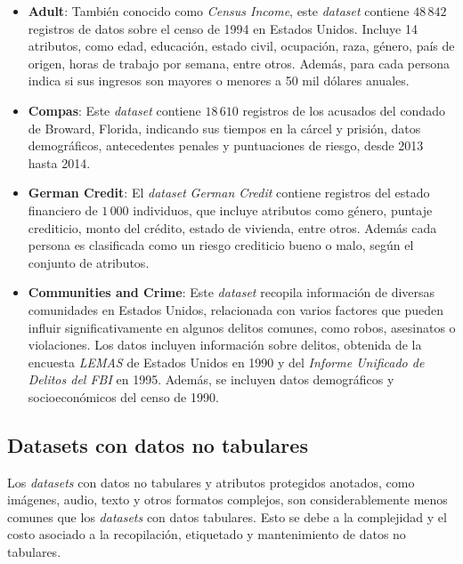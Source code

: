     \begin{itemize}
        \item \textbf{Adult}: Tambi\'en conocido como \emph{Census Income}, este \emph{dataset} contiene $48\,842$ registros de 
        datos sobre el censo de 1994 en Estados Unidos. Incluye 14 atributos, como edad, educaci\'on, estado civil,
        ocupaci\'on, raza, g\'enero, pa\'is de origen, horas de trabajo por semana, entre otros. Adem\'as, para cada 
        persona indica si sus ingresos son mayores o menores a 50 mil d\'olares anuales.
        \item \textbf{Compas}: Este \emph{dataset} contiene $18\,610$ registros de los acusados del condado de Broward, Florida,
        indicando sus tiempos en la c\'arcel y prisi\'on, datos demogr\'aficos, antecedentes penales y puntuaciones 
        de riesgo, desde 2013 hasta 2014.
        \item \textbf{German Credit}: El \emph{dataset} \emph{German Credit} contiene registros del estado financiero de $1\,000$ individuos,
        que incluye atributos como g\'enero, puntaje crediticio, monto del cr\'edito, estado de vivienda, entre otros. Adem\'as cada 
        persona es clasificada como un riesgo crediticio bueno o malo, seg\'un el conjunto de atributos.
        \item \textbf{Communities and Crime}: Este \emph{dataset} recopila informaci\'on de diversas comunidades en Estados Unidos, 
        relacionada con varios factores que pueden influir significativamente en algunos delitos comunes, como robos, asesinatos o 
        violaciones. Los datos incluyen informaci\'on sobre delitos, obtenida de la encuesta \emph{LEMAS} de Estados Unidos en 1990 y 
        del \emph{Informe Unificado de Delitos del FBI} en 1995. Adem\'as, se incluyen datos demogr\'aficos y socioecon\'omicos del 
        censo de 1990.

    \end{itemize}

    \subsection{Datasets con datos no tabulares}
    Los \emph{datasets} con datos no tabulares y atributos protegidos anotados, como im\'agenes, audio, texto y otros formatos complejos, 
    son considerablemente menos comunes que los \emph{datasets} con datos tabulares. Esto se debe a la complejidad y el costo asociado a la 
    recopilaci\'on, etiquetado y mantenimiento de datos no tabulares.

